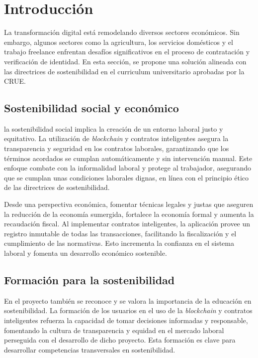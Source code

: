 
\section{Introducción}

La transformación digital está remodelando diversos sectores económicos. Sin embargo, algunos sectores como la agricultura, los servicios domésticos y el trabajo freelance enfrentan desafíos significativos en el proceso de contratación y verificación de identidad.
En esta sección, se propone una solución alineada con las directrices de sostenibilidad en el curriculum universitario aprobadas por la CRUE.


\subsection{Sostenibilidad social y económico}

la sostenibilidad social implica la creación de un entorno laboral justo y equitativo.
La utilización de \textit{blockchain} y contratos inteligentes asegura la transparencia y seguridad en los contratos laborales, garantizando que los términos acordados se cumplan automáticamente y sin intervención manual. 
Este enfoque combate con la informalidad laboral y protege al trabajador, asegurando que se cumplan unas condiciones laborales dignas, en línea con el principio ético de las directrices de sostenibilidad. 

Desde una perspectiva económica, fomentar técnicas legales y justas que aseguren la reducción de la economía sumergida, fortalece la economía formal y aumenta la recaudación fiscal.
Al implementar contratos inteligentes, la aplicación provee un registro inmutable de todas las transacciones, facilitando la fiscalización y el cumplimiento de las normativas.
Esto incrementa la confianza en el sistema laboral y fomenta un desarrollo económico sostenible.


\subsection{Formación para la sostenibilidad}

En el proyecto también se reconoce y se valora la importancia de la educación en sostenibilidad. La formación de los usuarios en el uso de la \textit{blockchain} y contratos inteligentes refuerza la capacidad de tomar decisiones informadas y responsable, fomentando la cultura de transparencia y equidad en el mercado laboral perseguida con el desarrollo de dicho proyecto.
Esta formación es clave para desarrollar competencias transversales en sostenibilidad.


